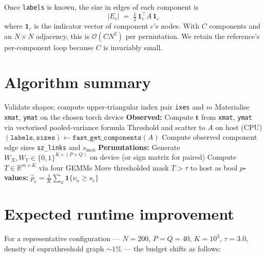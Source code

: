 \documentclass[11pt]{article}
\begin{document}
Once \texttt{labels} is known, the size in edges of each component is
%
\[
\bigl|E_c\bigr| \;=\; \tfrac{1}{2}\,\mathbf{1}_{c}^{\top} A\, \mathbf{1}_{c}
\]
%
where $\mathbf{1}_c$ is the indicator vector of component $c$'s nodes. With $C$ components and an $N\times N$ adjacency, this is $\mathcal{O}(C N^2)$ per permutation. We retain the reference's per-component loop because $C$ is invariably small.

\section{Algorithm summary}

\begin{algorithm}[H]
\SetAlgoLined
{}
\BlankLine
Validate shapes; compute upper-triangular index pair \texttt{ixes} and $m$\;
Materialise \texttt{xmat}, \texttt{ymat} on the chosen torch device\;
\BlankLine
\textbf{Observed:}\;
Compute $\mathbf{t}$ from \texttt{xmat}, \texttt{ymat} via vectorised pooled-variance formula\;
Threshold and scatter to $A$ on host (CPU)\;
$(\texttt{labels}, \texttt{sizes}) \gets \texttt{fast\_get\_components}(A)$\;
Compute observed component edge sizes \texttt{sz\_links} and $s_{\max}$\;
\BlankLine
\textbf{Permutations:}\;
Generate $W_X, W_Y \in \{0,1\}^{K\times(P+Q)}$ on device (or sign matrix for paired)\;
Compute $T \in \mathbb{R}^{m\times K}$ via four GEMMs\;
Move thresholded mask $T > \tau$ to host as bool\;
\BlankLine
\textbf{$p$-values:} $\hat p_c = \frac{1}{K}\sum_u \mathbf{1}\{\nu_u \ge s_c\}$\;
\;
\caption{NBS with batched torch $t$-statistics.}
\end{algorithm}

\section{Expected runtime improvement}

For a representative configuration --- $N=200$, $P=Q=40$, $K=10^3$, $\tau=3.0$, density of suprathreshold graph $\sim 1\%$ --- the budget shifts as follows:
\end{document}
